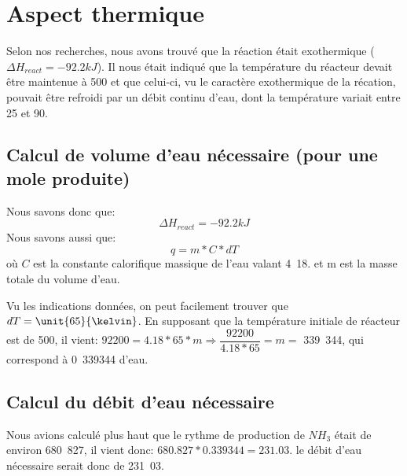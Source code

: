 \documentclass[11pt,a4paper]{report}
\begin{document}
\section*{Aspect thermique}
Selon nos recherches, nous avons trouvé que la réaction était exothermique ($\Delta H_{react} = -92.2kJ$).
Il nous était indiqué que la température du réacteur devait être maintenue à \unit{500}{\celsius} et que celui-ci, 
vu le caractère exothermique de la récation, pouvait être refroidi par un débit continu d'eau, dont la température 
variait entre \unit{25}{\celsius} et \unit{90}{\celsius}.

\subsection*{Calcul de volume d'eau nécessaire (pour une mole produite)}
Nous savons donc que: $$\Delta H_{react} = \unit{-92.2}{kJ}$$
Nous savons aussi que:
 $$q = m*C*dT$$
où $C$ est la constante calorifique massique de l'eau valant \unit{4.18}{\joule\per\celsius.\gram} et m est 
 la masse totale du volume d'eau.

 Vu les indications données, on peut facilement trouver que $dT=\unit{65}{\kelvin}$. En supposant que la température initiale de 
 réacteur est de \unit{500}{\celsius}, il vient: 
$92200 = 4.18*65*m \Rightarrow \dfrac{92200}{4.18*65} = m =$ \unit{339.344}{\gram}, qui correspond à \unit{0.339344}{\liter} d'eau.

\subsection{Calcul du débit d'eau nécessaire}

Nous avions calculé plus haut que le rythme de production de $NH_3$ était de environ \unit{680.827}{\mole\per\second},
il vient donc:  $680.827*0.339344 = 231.03$. 
le débit d'eau nécessaire serait donc de \unit{231.03}{\liter\per\second}.
\end{document}
